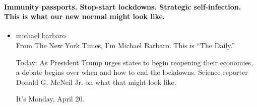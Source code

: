 \hypertarget{immunity-passports-stop-start-lockdowns-strategic-self-infection-this-is-what-our-new-normal-might-look-like}{%
\paragraph{Immunity passports. Stop-start lockdowns. Strategic
self-infection. This is what our new normal might look
like.}\label{immunity-passports-stop-start-lockdowns-strategic-self-infection-this-is-what-our-new-normal-might-look-like}}

\begin{itemize}
\item
  michael barbaro\\
  From The New York Times, I'm Michael Barbaro. This is ``The Daily.''

  Today: As President Trump urges states to begin reopening their
  economies, a debate begins over when and how to end the lockdowns.
  Science reporter Donald G. McNeil Jr. on what that might look like.

  It's Monday, April 20.


\end{itemize}
